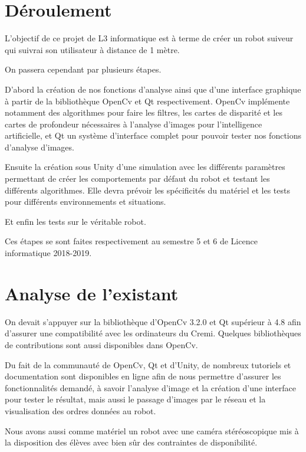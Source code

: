 \documentclass{article}
\begin{document}
\section{Déroulement}
	L'objectif de ce projet de L3 informatique est à terme de créer un robot suiveur qui suivrai son utilisateur à distance de 1 mètre.
\par\leavevmode\par
	On passera cependant par plusieurs étapes.
\par\leavevmode
	D'abord la création de nos fonctions d'analyse ainsi que d'une interface graphique à partir de la bibliothèque OpenCv et Qt respectivement. OpenCv implémente notamment des algorithmes pour faire les filtres, les cartes de disparité et les cartes de profondeur nécessaires à l'analyse d'images pour l'intelligence artificielle, et Qt un système d'interface complet pour pouvoir tester nos fonctions d'analyse d'images.\\
\par\leavevmode
	Ensuite la création sous Unity d'une simulation avec les différents paramètres permettant de créer les comportements par défaut du robot et testant les différents algorithmes. Elle devra prévoir les spécificités du matériel et les tests pour différents environnements et situations.\\
\par\leavevmode
	Et enfin les tests sur le véritable robot.
	
\par\leavevmode\par
	Ces étapes se sont faites respectivement au semestre 5 et 6 de Licence informatique 2018-2019.
	
\newpage
\section{Analyse de l’existant}

On devait s'appuyer sur la bibliothèque d'OpenCv 3.2.0 et Qt supérieur à 4.8 afin d'assurer une compatibilité avec les ordinateurs du Cremi. Quelques bibliothèques de contributions sont aussi disponibles dans OpenCv.
\par\leavevmode\par
Du fait de la communauté de OpenCv, Qt et d'Unity, de nombreux tutoriels et documentation sont disponibles en ligne afin de nous permettre d'assurer les fonctionnalités demandé, à savoir l'analyse d'image et la création d'une interface pour tester le résultat, mais aussi le passage d'images par le réseau et la visualisation des ordres données au robot.
\par\leavevmode\par
Nous avons aussi comme matériel un robot avec une caméra stéréoscopique mis à la disposition des élèves avec bien sûr des contraintes de disponibilité.
\end{document}
